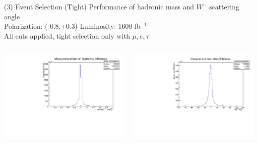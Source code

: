 \documentclass[10pt]{beamer}
\begin{document}
\begin{frame}{(3) Event Selection (Tight)}
Performance of hadronic mass and $W^{-}$ scattering angle\\
Polarization: (-0.8,+0.3)\quad
Luminosity: 1600 fb$^{-1}$\\
All cuts applied, tight selection only with $\mu ,e, \tau$

\begin{columns}
\begin{column}{0.5\textwidth}
\includegraphics[scale=0.3, left]{qcostdiffHist.pdf} \\

\end{column}
\begin{column}{0.5\textwidth}
\includegraphics[scale=0.3, left]{mqqdiffHist.pdf} \\

\end{column}
\end{columns}

\end{frame}
\end{document}
